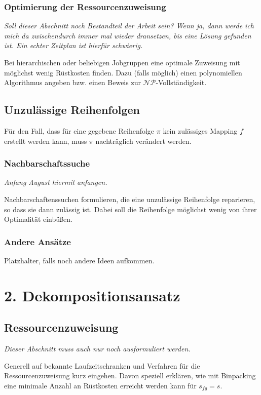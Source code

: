\documentclass{scrreprt}
\begin{document}
\subsection{Optimierung der Ressourcenzuweisung}
\label{subsec:OptimierungDerRessourcenzuweisung}
\textit{Soll dieser Abschnitt noch Bestandteil der Arbeit sein? Wenn ja, dann werde ich mich da zwischendurch immer mal wieder dransetzen,
bis eine Lösung gefunden ist. Ein echter Zeitplan ist hierfür schwierig.}

Bei hierarchischen oder beliebigen Jobgruppen eine optimale Zuweisung mit möglichst wenig Rüstkosten finden.
Dazu (falls möglich) einen polynomiellen Algorithmus angeben bzw. einen Beweis zur $\mathcal{NP}$-Vollständigkeit.

\section{Unzulässige Reihenfolgen}
\label{UnzulaessigeReihenfolgen}
Für den Fall, dass für eine gegebene Reihenfolge $\pi$ kein zulässiges Mapping $f$ erstellt werden kann, muss $\pi$ nachträglich verändert werden.

\subsection{Nachbarschaftssuche}

\textit{Anfang August hiermit anfangen.}

Nachbarschaftenssuchen formulieren, die eine unzulässige Reihenfolge reparieren, so dass sie dann zulässig ist.
Dabei soll die Reihenfolge möglichst wenig von ihrer Optimalität einbüßen.

\subsection{Andere Ansätze}
Platzhalter, falls noch andere Ideen aufkommen.






\chapter{2. Dekompositionsansatz}
\section{Ressourcenzuweisung}
\textit{Dieser Abschnitt muss auch nur noch ausformuliert werden.}

Generell auf bekannte Laufzeitschranken und Verfahren für die Ressourcenzuweisung kurz eingehen.
Davon speziell erklären, wie mit Binpacking eine minimale Anzahl an Rüstkosten erreicht werden kann für $s_{fg}=s$.
\end{document}
